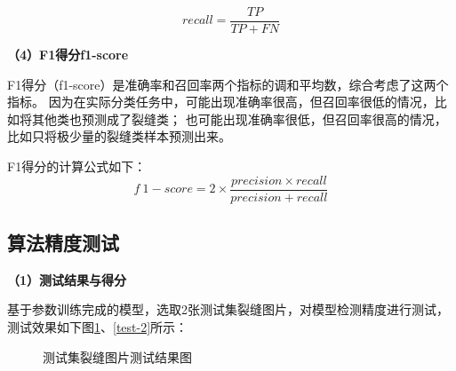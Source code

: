 \begin{equation}
    recall=\frac{TP}{TP+FN}
\end{equation}

\textbf{（4）F1得分f1-score}

F1得分（f1-score）是准确率和召回率两个指标的调和平均数，综合考虑了这两个指标。
因为在实际分类任务中，可能出现准确率很高，但召回率很低的情况，比如将其他类也预测成了裂缝类；
也可能出现准确率很低，但召回率很高的情况，比如只将极少量的裂缝类样本预测出来。

F1得分的计算公式如下：
\begin{equation}
    f~1{-}score=2\times\frac{precision\times{recall}}{precision+recall}
\end{equation}

\subsection{算法精度测试}

\textbf{（1）测试结果与得分}

基于参数训练完成的模型，选取2张测试集裂缝图片，对模型检测精度进行测试，
测试效果如下图\ref{test-1}、\ref{test-2}所示：

\begin{figure}[H]
    \caption{测试集裂缝图片测试结果图}
    \label{test-1}
\end{figure}

